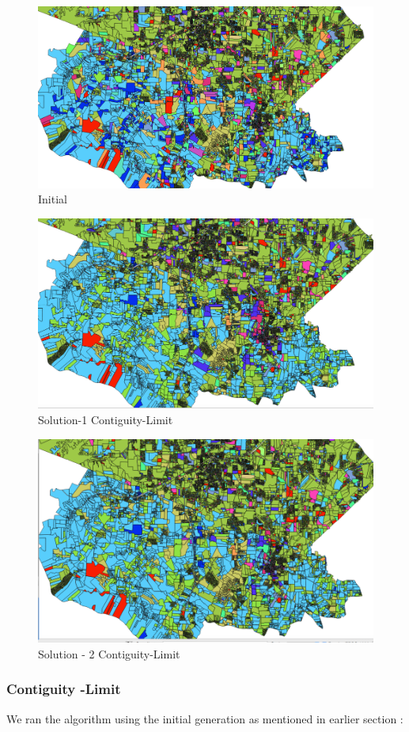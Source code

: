 \documentclass{sig-alternate}
\begin{document}
\begin{figure}
\centering
\includegraphics[width=4.5in]{Cont.png}
\caption{Initial}
\end{figure}

\begin{figure}
\centering
\includegraphics[width=4.5in]{ContSol1.png}
\caption{Solution-1 Contiguity-Limit}
\end{figure}
\begin{figure}
\centering
\includegraphics[width=4.5in]{ContSol2.png}
\caption{Solution - 2 Contiguity-Limit}
\end{figure}


\subsubsection{Contiguity -Limit}
We ran the algorithm using the  initial generation as mentioned in earlier section :
\end{document}
